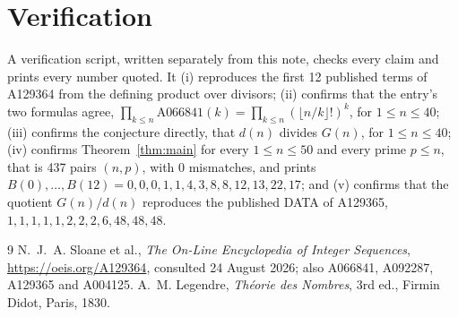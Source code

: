 \documentclass[11pt,a4paper]{article}
\theoremstyle{plain}
\theoremstyle{definition}
\begin{document}
\section{Verification}

A verification script, written separately from this note, checks every claim and prints
every number quoted. It (i) reproduces the first 12 published terms of A129364 from the
defining product over divisors; (ii) confirms that the entry's two formulas agree,
$\prod_{k\le n}\mathrm{A066841}(k)=\prod_{k\le n}(\lfloor n/k\rfloor!)^{k}$, for
$1\le n\le40$; (iii) confirms the conjecture directly, that $d(n)$ divides $G(n)$, for
$1\le n\le40$; (iv) confirms Theorem~\ref{thm:main} for every $1\le n\le50$ and every prime
$p\le n$, that is 437 pairs $(n,p)$, with 0 mismatches, and prints
$B(0),\dots,B(12)=0,0,0,1,1,4,3,8,8,12,13,22,17$; and (v) confirms that the quotient
$G(n)/d(n)$ reproduces the published DATA of A129365,
$1,1,1,1,1,2,2,2,6,48,48,48$.

\begin{thebibliography}{9}
 N.~J.~A. Sloane et al., \emph{The On-Line Encyclopedia of Integer
Sequences}, \url{https://oeis.org/A129364}, consulted 24 August 2026; also A066841,
A092287, A129365 and A004125.
 A.~M. Legendre, \emph{Th\'eorie des Nombres}, 3rd ed., Firmin Didot,
Paris, 1830.
\end{thebibliography}
\end{document}
